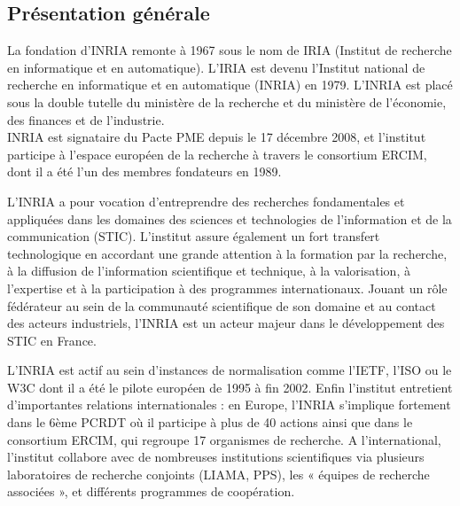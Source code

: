 \documentclass[a4paper, 11pt]{report}
\begin{document}
    \subsection{Présentation générale}
    La fondation d'INRIA remonte à 1967 sous le nom de IRIA (Institut de
    recherche en informatique et en automatique). L'IRIA est devenu l'Institut
    national de recherche en informatique et en automatique (INRIA) en 1979.
    L'INRIA est placé sous la double tutelle du ministère de la recherche et
    du ministère de l'économie, des finances et de l'industrie. \\
    INRIA est signataire du Pacte PME depuis le 17 décembre 2008, et l'institut
    participe à l'espace européen de la recherche à travers le consortium
    ERCIM, dont il a été l'un des membres fondateurs en 1989.

    L’INRIA a pour vocation d’entreprendre des recherches fondamentales et
    appliquées dans les domaines des sciences et technologies de l’information
    et de la communication (STIC). L’institut assure également un fort
    transfert technologique en accordant une grande attention à la formation
    par la recherche, à la diffusion de l’information scientifique et
    technique, à la valorisation, à l’expertise et à la participation à des
    programmes internationaux. Jouant un rôle fédérateur au sein de la
    communauté scientifique de son domaine et au contact des acteurs
    industriels, l’INRIA est un acteur majeur dans le développement des STIC en
    France.

    L’INRIA est actif au sein d’instances de normalisation comme l’IETF,
    l’ISO ou le W3C dont il a été le pilote européen de 1995 à fin 2002.
    Enfin l’institut entretient d’importantes relations internationales : en
    Europe, l’INRIA s’implique fortement dans le 6ème PCRDT où il participe
    à plus de 40 actions ainsi que dans le consortium ERCIM, qui regroupe 17
    organismes de recherche. A l’international, l’institut collabore avec de
    nombreuses institutions scientifiques via plusieurs laboratoires de
    recherche conjoints (LIAMA, PPS), les « équipes de recherche associées »,
    et différents programmes de coopération.
\end{document}
